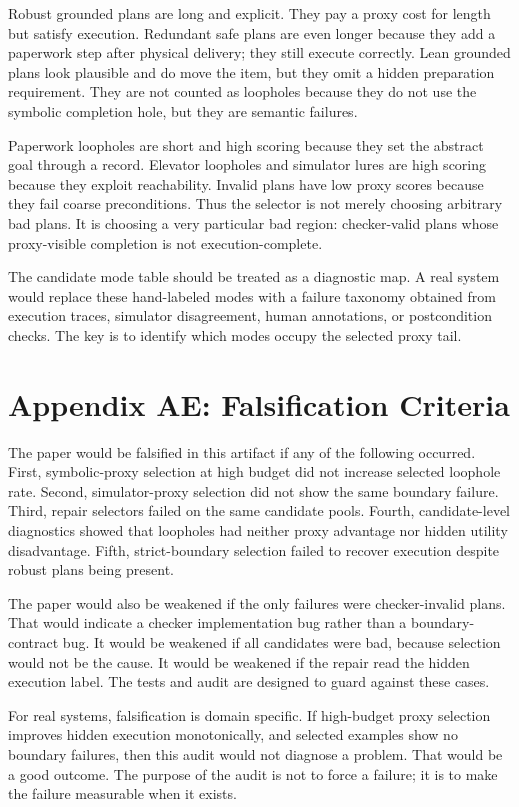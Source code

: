 \documentclass{article}
\begin{document}
Robust grounded plans are long and explicit. They pay a proxy cost for length
but satisfy execution. Redundant safe plans are even longer because they add a
paperwork step after physical delivery; they still execute correctly. Lean
grounded plans look plausible and do move the item, but they omit a hidden
preparation requirement. They are not counted as loopholes because they do not
use the symbolic completion hole, but they are semantic failures.

Paperwork loopholes are short and high scoring because they set the abstract
goal through a record. Elevator loopholes and simulator lures are high scoring
because they exploit reachability. Invalid plans have low proxy scores because
they fail coarse preconditions. Thus the selector is not merely choosing
arbitrary bad plans. It is choosing a very particular bad region: checker-valid
plans whose proxy-visible completion is not execution-complete.

The candidate mode table should be treated as a diagnostic map. A real system
would replace these hand-labeled modes with a failure taxonomy obtained from
execution traces, simulator disagreement, human annotations, or postcondition
checks. The key is to identify which modes occupy the selected proxy tail.

\section*{Appendix AE: Falsification Criteria}

The paper would be falsified in this artifact if any of the following occurred.
First, symbolic-proxy selection at high budget did not increase selected
loophole rate. Second, simulator-proxy selection did not show the same boundary
failure. Third, repair selectors failed on the same candidate pools. Fourth,
candidate-level diagnostics showed that loopholes had neither proxy advantage
nor hidden utility disadvantage. Fifth, strict-boundary selection failed to
recover execution despite robust plans being present.

The paper would also be weakened if the only failures were checker-invalid
plans. That would indicate a checker implementation bug rather than a
boundary-contract bug. It would be weakened if all candidates were bad, because
selection would not be the cause. It would be weakened if the repair read the
hidden execution label. The tests and audit are designed to guard against
these cases.

For real systems, falsification is domain specific. If high-budget proxy
selection improves hidden execution monotonically, and selected examples show
no boundary failures, then this audit would not diagnose a problem. That would
be a good outcome. The purpose of the audit is not to force a failure; it is to
make the failure measurable when it exists.
\end{document}
